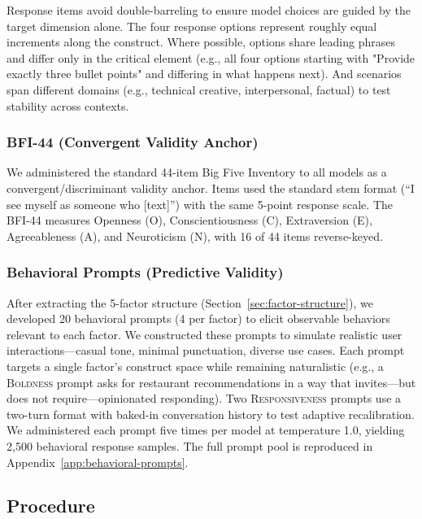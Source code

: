 \documentclass[11pt]{article}
\newcommand{\factorname}[1]{\textsc{#1}}
\newcommand{\nbehavioralsamples}{2{,}500}
\begin{document}
Response items avoid double-barreling to ensure model choices are guided by the target dimension alone. The four response options represent roughly equal increments along the construct. Where possible, options share leading phrases and differ only in the critical element (e.g., all four options starting with "Provide exactly three bullet points" and differing in what happens next). And scenarios span different domains (e.g., technical creative, interpersonal, factual) to test stability across contexts.

\subsubsection{BFI-44 (Convergent Validity Anchor)}
\label{sec:bfi}

We administered the standard 44-item Big Five Inventory \citep{john1999big}  to all models as a convergent/discriminant validity anchor.
Items used the standard stem format (``I see myself as someone who [text]'') with the same 5-point response scale.
The BFI-44 measures Openness (O), Conscientiousness (C), Extraversion (E), Agreeableness (A), and Neuroticism (N), with 16 of 44 items reverse-keyed.

\subsubsection{Behavioral Prompts (Predictive Validity)}
\label{sec:behavioral}
After extracting the 5-factor structure (Section~\ref{sec:factor-structure}), we developed 20 behavioral prompts (4 per factor) to elicit observable behaviors relevant to each factor.
We constructed these prompts to simulate realistic user interactions---casual tone, minimal punctuation, diverse use cases.
Each prompt targets a single factor's construct space while remaining naturalistic (e.g., a \factorname{Boldness} prompt asks for restaurant recommendations in a way that invites---but does not require---opinionated responding).
Two \factorname{Responsiveness} prompts use a two-turn format with baked-in conversation history to test adaptive recalibration.
We administered each prompt five times per model at temperature 1.0, yielding \nbehavioralsamples{} behavioral response samples.
The full prompt pool is reproduced in Appendix~\ref{app:behavioral-prompts}.


\subsection{Procedure}
\label{sec:procedure}
\end{document}
